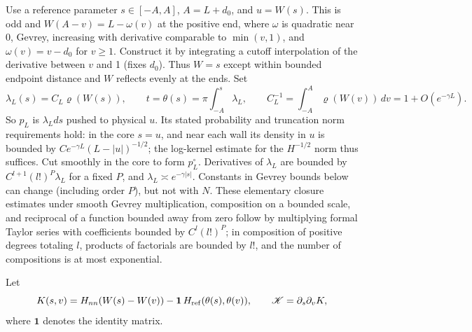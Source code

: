 Use a reference parameter \(s\in[-A,A]\), \(A=L+d_0\), and \(u=W(s)\). This is odd and \(W(A-v)=L-\omega(v)\) at the positive end, where \(\omega\) is quadratic near 0, Gevrey, increasing with derivative comparable to \(\min(v,1)\), and \(\omega(v)=v-d_0\) for \(v\ge1\). Construct it by integrating a cutoff interpolation of the derivative between \(v\) and 1 (fixes \(d_0\)). Thus \(W=s\) except within bounded endpoint distance and \(W\) reflects evenly at the ends. Set
\[
 \lambda_L(s)=C_L\varrho(W(s)),\qquad
 t=\theta(s)=\pi\int_{-A}^s\lambda_L,\qquad
 C_L^{-1}=\int_{-A}^{A}\varrho(W(v))\,dv=1+O(e^{-\gamma L}).
\]
So \(p_L\) is \(\lambda_L ds\) pushed to physical \(u\). Its stated probability and truncation norm requirements hold: in the core \(s=u\), and near each wall its density in \(u\) is bounded by \(C e^{-\gamma L}(L-|u|)^{-1/2}\); the log-kernel estimate for the \(H^{-1/2}\) norm thus suffices. Cut smoothly in the core to form \(p_L^\circ\). Derivatives of \(\lambda_L\) are bounded by \(C^{l+1}(l!)^{P}\lambda_L\) for a fixed \(P\), and \(\lambda_L\asymp e^{-\gamma|s|}\). Constants in Gevrey bounds below can change (including order \(P\)), but not with \(N\). These elementary closure estimates under smooth Gevrey multiplication, composition on a bounded scale, and reciprocal of a function bounded away from zero follow by multiplying formal Taylor series with coefficients bounded by \(C^l(l!)^{P}\); in composition of positive degrees totaling \(l\), products of factorials are bounded by \(l!\), and the number of compositions is at most exponential.

Let
\[
 K(s,v)=H_{nn}(W(s)-W(v))-\mathbf 1\,H_{\rm ref}(\theta(s),\theta(v)),
 \qquad \mathscr K=\partial_s\partial_v K ,
\]
where \(\mathbf 1\) denotes the identity matrix.


